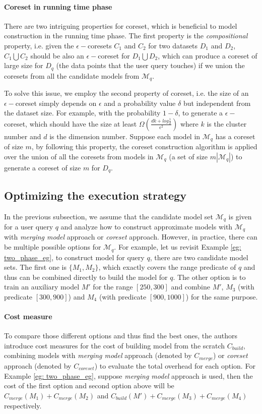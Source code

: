 \paragraph{Coreset in running time phase} There are two intriguing properties for coreset, which is beneficial to model construction in the running time phase. The first property is the {\em compositional} property, i.e. given the $\epsilon-$coresets $C_1$ and $C_2$ for two datasets $D_1$ and $D_2$, $C_1 \bigcup C_2$ should be also an $\epsilon-$coreset for $D_1 \bigcup D_2$, which can produce a coreset of large size for $D_q$ (the data points that the user query touches) if we union the coresets from all the candidate models from $\mathcal{M}_q$. 

To solve this issue, we employ the second property of coreset, i.e. the size of an $\epsilon-$coreset simply depends on $\epsilon$ and a probability value $\delta$ but independent from the dataset size. For example, with the probability $1-\delta$, to generate a $\epsilon-$coreset, which should have the size at least $\Omega(\frac{dk+log\frac{1}{\delta}}{\epsilon^2})$ where $k$ is the cluster number and $d$ is the dimension number. Suppose each model in $\mathcal{M}_q$ has a coreset of size $m$, by following this property, the coreset construction algorithm is applied over the union of all the coresets from models in $\mathcal{M}_q$ (a set of size $m|\mathcal{M}_q|$) to generate a coreset of size $m$ for $D_q$.


\subsection{Optimizing the execution strategy}\label{sec: opt}
In the previous subsection, we assume that the candidate model set $\mathcal{M}_q$ is given for a user query $q$ and analyze how to construct approximate models with $\mathcal{M}_q$ with {\em merging model} approach or {\em coreset} approach. However, in practice, there can be multiple possible options for $\mathcal{M}_q$. For example, let us revisit Example \ref{eg: two_phase_eg}, to construct model for query $q$, there are two candidate model sets. The first one is $\{M_1, M_2\}$, which exactly covers the range predicate of $q$ and thus can be combined directly to build the model for $q$. The other option is to train an auxiliary model $M'$ for the range $[250, 300]$ and combine $M'$, $M_3$ (with predicate $[300, 900]$) and $M_4$ (with predicate $[900, 1000]$) for the same purpose. 

\paragraph{Cost measure} To compare those different options and thus find the best ones, the authors introduce cost measures for the cost of building model from the scratch $C_{build}$, combining models with {\em merging model} approach (denoted by $C_{merge}$) or {\em coreset} approach (denoted by $C_{coreset}$) to evaluate the total overhead for each option. For Example \ref{eg: two_phase_eg}, suppose {\em merging model} approach is used, then the cost of the first option and second option above will be $C_{merge}(M_1) + C_{merge}(M_2)$ and $C_{build}(M') + C_{merge}(M_3) + C_{merge}(M_4)$ respectively. 

